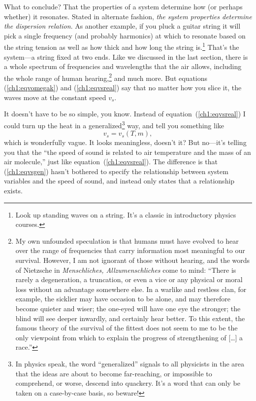 What to conclude? That the properties of a system determine how (or perhaps
whether) it resonates. Stated in alternate fashion, \emph{the system properties
  determine the dispersion relation}.  As another example, if you pluck a guitar
string it will pick a single frequency (and probably harmonics) at which to
resonate based on the string tension as well as how thick and how long the
string is.\footnote{Look up standing waves on a string. It's a classic in
  introductory physics courses.} That's the system---a string fixed at two
ends. Like we discussed in the last section, there is a whole spectrum of
frequencies and wavelengths that the air allows, including the whole range of
human hearing,\footnote{My own unfounded speculation is that humans must have
  evolved to hear over the range of frequencies that carry information most
  meaningful to our survival. However, I am not ignorant of those without
  hearing, and the words of Nietzsche in \textit{Menschliches,
    Allzumenschliches} come to mind: ``There is rarely a degeneration, a
  truncation, or even a vice or any physical or moral loss without an advantage
  somewhere else. In a warlike and restless clan, for example, the sicklier may
  have occasion to be alone, and may therefore become quieter and wiser; the
  one-eyed will have one eye the stronger; the blind will see deeper inwardly,
  and certainly hear better. To this extent, the famous theory of the survival
  of the fittest does not seem to me to be the only viewpoint from which to
  explain the progress of strengthening of [\dots] a race.''} and much more. But
equations (\ref{ch1:eqvomegak}) and (\ref{ch1:eqvsreal}) say that no matter how
you slice it, the waves move at the constant speed $v_s$.

It doesn't have to be so simple, you know. Instead of
equation~(\ref{ch1:eqvsreal}) I could turn up the heat in a
generalized\footnote{In physics speak, the word ``generalized'' signals to all
  physicists in the area that the ideas are about to become far-reaching, or
  impossible to comprehend, or worse, descend into quackery. It's a word that
  can only be taken on a case-by-case basis, so beware!}  way, and tell you
something like
\begin{equation}
  \label{ch1:eqvsgen}
  v_s = v_s (T, m),
\end{equation}
which is wonderfully vague. It looks meaningless, doesn't it? But no---it's
telling you that the ``the speed of sound is related to air temperature and the
mass of an air molecule,'' just like equation~(\ref{ch1:eqvsreal}). The
difference is that (\ref{ch1:eqvsgen}) hasn't bothered to specify the
relationship between system variables and the speed of sound, and instead only
states that a relationship exists.

